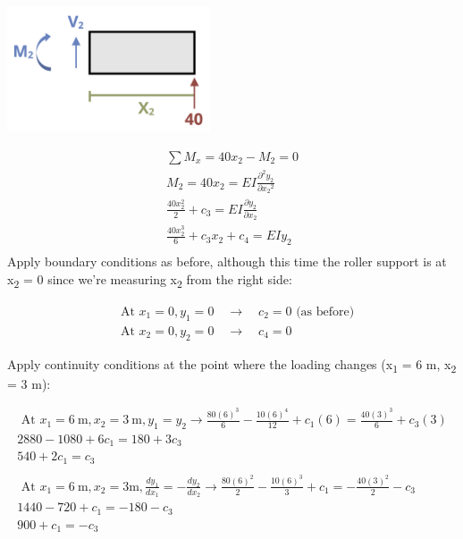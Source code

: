 \documentclass[
  letterpaper,
  DIV=11,
  numbers=noendperiod]{scrreprt}
\begin{document}
\begin{tcolorbox}
\begin{tcolorbox}
\begin{center}
\includegraphics[width=2.36458in,height=\textheight]{images/CH11 PNGs/example11.3v2-2.png}
\end{center}

\[
\begin{gathered}
\sum M_x= 40 x_2-M_2=0 \\
M_2=40 x_2=EI\frac{\partial^2 y_2}{\partial x_2{ }^2} \\
\frac{40 x_2^2}{2}+c_3=EI \frac{\partial y_2}{\partial x_2} \\
\frac{40 x_2^3}{6}+c_3 x_2+c_4=E I y_2 \\
\end{gathered}
\]Apply boundary conditions as before, although this time the roller
support is at x\textsubscript{2} = 0 since we're measuring
x\textsubscript{2} from the right side:

\[
\begin{aligned} & \text { At } x_1=0, y_1=0 \quad \rightarrow \quad c_2=0 \text { (as before) }\\ & \text { At } x_2=0, y_2=0 \quad \rightarrow \quad c_4=0\end{aligned}
\]

Apply continuity conditions at the point where the loading changes
(x\textsubscript{1} = 6 m, x\textsubscript{2} = 3 m):

\[
\begin{gathered} \text { At } x_1=6 \mathrm{~m}, x_2=3 \mathrm{~m}, y_1=y_2 \rightarrow \frac{80(6)^3}{6}-\frac{10(6)^4}{12}+ c_1(6)=\frac{40(3)^3}{6}+c_3(3) \\ 2880-1080+6 c_1=180+3 c_3 \\ 540+2 c_1=c_3 \\ \\ \text { At } x_1=6 \mathrm{~m},  x_2=3 \mathrm{m}, \frac{d y_1}{d x_1}=-\frac{d y_2}{d x_2} \rightarrow \frac{80(6)^2}{2}-\frac{10(6)^3}{3}+c_1=-\frac{40(3)^2}{2}-c_3 \\ 1440-720+c_1=-180-c_3 \\ 900+c_1=-c_3 \\\end{gathered}
\]


\end{tcolorbox}
\end{tcolorbox}
\end{document}
